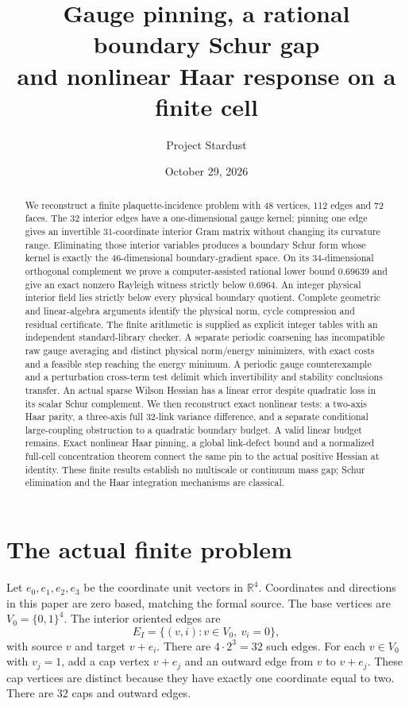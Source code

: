 \documentclass[11pt]{article}
\title{Gauge pinning, a rational boundary Schur gap\\and nonlinear Haar response on a finite cell}
\author{Project Stardust}\date{October 29, 2026}
\newcommand{\R}{\mathbb R}\newcommand{\Z}{\mathbb Z}
\begin{document}
\maketitle
\begin{abstract}
We reconstruct a finite plaquette-incidence problem with 48 vertices,
112 edges and 72 faces. The 32 interior edges have a one-dimensional gauge
kernel; pinning one edge gives an invertible 31-coordinate interior Gram
matrix without changing its curvature range. Eliminating those interior
variables produces a boundary Schur form whose kernel is exactly the
46-dimensional boundary-gradient space. On its 34-dimensional orthogonal
complement we prove a computer-assisted rational lower bound $0.69639$ and
give an exact nonzero Rayleigh witness strictly below $0.6964$. An integer physical interior field lies strictly below every physical boundary quotient. Complete
geometric and linear-algebra arguments identify the physical norm, cycle
compression and residual certificate. The finite arithmetic is supplied as
explicit integer tables with an independent standard-library checker.
A separate periodic coarsening has incompatible raw gauge averaging and distinct physical norm/energy minimizers, with exact costs and a feasible step reaching the energy minimum. A periodic gauge counterexample and a perturbation cross-term test delimit
which invertibility and stability conclusions transfer. An actual sparse Wilson Hessian has a linear error despite quadratic loss in its scalar Schur complement. We then reconstruct exact nonlinear tests: a two-axis Haar parity, a
three-axis full 32-link variance difference, and a separate conditional
large-coupling obstruction to a quadratic boundary budget. A valid linear
budget remains. Exact nonlinear Haar pinning, a global link-defect bound
and a normalized full-cell concentration theorem connect the same pin to
the actual positive Hessian at identity. These finite results establish no multiscale or continuum
mass gap; Schur elimination and the Haar integration mechanisms are classical.
\end{abstract}

\section{The actual finite problem}
Let $e_0,e_1,e_2,e_3$ be the coordinate unit vectors in $\R^4$. Coordinates
and directions in this paper are zero based, matching the formal source.
The base vertices are $V_0=\{0,1\}^4$. The interior oriented edges are
\[
 E_I=\{(v,i):v\in V_0,\ v_i=0\},
\]
with source $v$ and target $v+e_i$. There are $4\cdot2^3=32$ such edges.
For each $v\in V_0$ with $v_j=1$, add a cap vertex $v+e_j$ and an outward
edge from $v$ to $v+e_j$. These cap vertices are distinct because they have
exactly one coordinate equal to two. There are 32 caps and outward edges.
\end{document}
